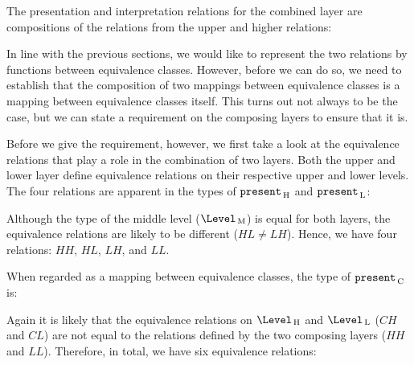 
\fromHere

 \label{sect:combinedExtraCompose}

The presentation and interpretation relations for the combined layer are compositions of the relations from the upper and higher relations: %

\xpr{
\Present\C = \Present\L \oo \Present\H\\
\Interpret\C = \Interpret\H \oo\Interpret\L\\
}

In line with the previous sections, we would like to represent the two relations by functions between equivalence classes. However, before we can do so, we need to establish that the composition of two mappings between equivalence classes is a mapping between equivalence classes itself. This turns out not always to be the case, but we can state a requirement on the composing layers to ensure that it is.

Before we give the requirement, however, we first take a look at the equivalence relations that play a role in the combination of two layers. Both the upper and lower layer 
define equivalence relations on their respective upper and lower levels. The four relations are apparent in the types of ${\tt present}_{\, \mathrm H}$ and ${\tt present}_{\, \mathrm L}$:


Although the type of the middle level ($\Level\M$) is equal for both layers, the equivalence relations are likely to be different ($HL \neq LH$). Hence, we have four relations: $HH$, $HL$, $LH$, and $LL$.

When regarded as a mapping between equivalence classes, the type of ${\tt present}_{\, \mathrm C}$ is:


Again it is likely that the equivalence relations on $\Level\H$ and $\Level\L$ ($CH$ and $CL$) are not equal to the relations defined by the two composing layers ($HH$ and $LL$). Therefore, in total, we have six equivalence relations:

